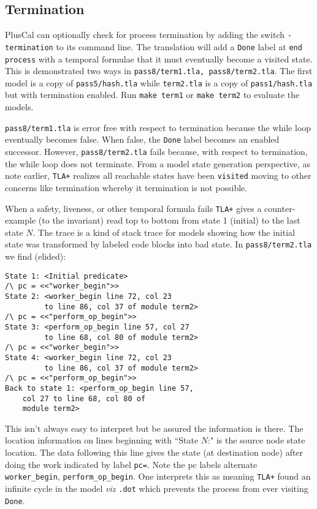 \documentclass[twocolumn]{article}
\begin{document}
\subsection{Termination}
PlusCal can optionally check for process termination by adding the switch \texttt{-termination} to its command line. The translation will add a \texttt{Done} label at \texttt{end process} with a temporal formulae that it must eventually become a visited state. This is demonstrated two ways in \texttt{pass8/term1.tla, pass8/term2.tla}. The first model is a copy of \texttt{pass5/hash.tla} while \texttt{term2.tla} is a copy of \texttt{pass1/hash.tla} but with termination enabled. Run \texttt{make term1} or \texttt{make term2} to evaluate the models.

\texttt{pass8/term1.tla} is error free with respect to termination because the while loop eventually becomes false. When false, the \texttt{Done} label becomes an enabled successor. However, \texttt{pass8/term2.tla} fails because, with respect to termination, the while loop does not terminate. From a model state generation perspective, as note earlier, \texttt{TLA+} realizes all reachable states have been \texttt{visited} moving to other concerns like termination whereby it termination is not possible.

When a safety, liveness, or other temporal formula fails \texttt{TLA+} gives a counter-example (to the invariant) read top to bottom from state 1 (initial) to the last state $N$. The trace is a kind of stack trace for models showing how the initial state was transformed by labeled code blocks into bad state. In \texttt{pass8/term2.tla} we find (elided):

\begin{verbatim}
State 1: <Initial predicate>
/\ pc = <<"worker_begin">>
State 2: <worker_begin line 72, col 23 
         to line 86, col 37 of module term2>
/\ pc = <<"perform_op_begin">>
State 3: <perform_op_begin line 57, col 27
         to line 68, col 80 of module term2>
/\ pc = <<"worker_begin">>
State 4: <worker_begin line 72, col 23 
         to line 86, col 37 of module term2>
/\ pc = <<"perform_op_begin">>
Back to state 1: <perform_op_begin line 57, 
    col 27 to line 68, col 80 of 
    module term2>
\end{verbatim}
 
This isn't always easy to interpret but be assured the information is there. The location information on lines beginning with ``State $N$:" is the source node state location. The data following this line gives the state (at destination node) after doing the work indicated by label \texttt{pc=}. Note the pc labels alternate \texttt{worker\_begin}, \texttt{perform\_op\_begin}. One interprets this as meaning \texttt{TLA+} found an infinite cycle in the model \emph{viz} \texttt{.dot} which prevents the process from ever visiting \texttt{Done}.
\end{document}
